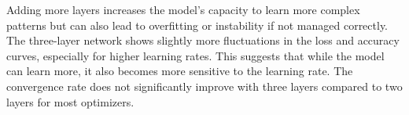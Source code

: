 \documentclass[12pt]{article}
\begin{document}
\begin{itemize}
	      Adding more layers increases the model's capacity to learn more complex patterns but can also lead to overfitting or instability if not managed correctly.  The three-layer network shows slightly more fluctuations in the loss and accuracy curves, especially for higher learning rates. This suggests that while the model can learn more, it also becomes more sensitive to the learning rate. The convergence rate does not significantly improve with three layers compared to two layers for most optimizers.
\end{itemize}
\end{document}
